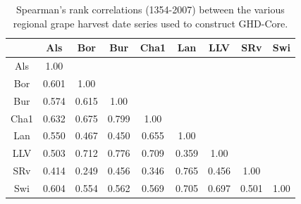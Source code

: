 \documentclass[12pt]{article}
\begin{document}
\begin{table}
\small
\caption{\small Spearman's rank correlations (1354-2007) between the various regional grape harvest date series used to construct GHD-Core.}
\centering
\begin{tabular}{c c c c c c c c c}
\hline
& Als & Bor & Bur & Cha1 & Lan & LLV & SRv & Swi \\
\hline
Als &1.00 &  &  &  &  &  &  & \\
Bor & 0.601 & 1.00 &  &  &  &  &  & \\
Bur & 0.574 & 0.615 & 1.00 &  &  &  &  & \\
Cha1 & 0.632 & 0.675 & 0.799 & 1.00 &  &  &  & \\
Lan & 0.550 & 0.467 & 0.450 & 0.655 & 1.00 &  &  & \\
LLV & 0.503 & 0.712 & 0.776 & 0.709 & 0.359 & 1.00 &  & \\
SRv & 0.414 & 0.249 & 0.456 & 0.346 & 0.765 & 0.456 & 1.00 & \\
Swi & 0.604 & 0.554 & 0.562 & 0.569 & 0.705 & 0.697 & 0.501 & 1.00\\
\hline
\end{tabular}
\end{table}
\end{document}
